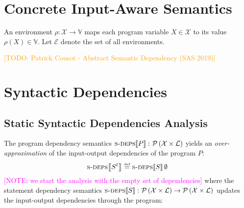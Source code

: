 \documentclass{article}
\newcommand{\defined}{\ensuremath{\stackrel{\mbox{\tiny def}}{=}}\xspace} %
\newcommand{\vars}{\ensuremath{\mathcal{X}}\xspace} %
\newcommand{\vals}{\ensuremath{\mathbb{V}}\xspace} %
\newcommand{\powerset}[1]{\ensuremath{\mathcal{P}\left(#1\right)}\xspace} %
\newcommand{\labels}{\ensuremath{\mathcal{L}}\xspace} %
\newcommand{\envs}{\ensuremath{\mathcal{E}}\xspace} %
\newcommand{\semantics}[1]{\ensuremath{\left\llbracket #1 \right\rrbracket}\xspace} %
\newcommand{\sdeps}[1]{\ensuremath{\textsc{s-deps}\!\semantics{#1}}\xspace} %
\newcommand{\irem}[3]{{\noindent\textcolor{#1}{\textsf{[#2: 
#3]}}}}
\newcommand{\todo}[1]{\irem{orange}{TODO}{#1}}
\newcommand{\note}[1]{\irem{magenta}{NOTE}{#1}}
\begin{document}
\section*{Concrete Input-Aware Semantics}

An environment $\rho\colon \vars \rightarrow \vals$ maps each program variable $X \in \vars$ to its value $\rho(X) \in \vals$. Let \envs denote the set of all environments. 

\todo{Patrick Cousot - Abstract Semantic Dependency (SAS 2019)}


\section*{Syntactic Dependencies}

\subsection*{Static Syntactic Dependencies Analysis}

The program dependency semantics $\sdeps{P} \colon \powerset{\vars \times \labels}$ yields an \emph{over-approximation} of the input-output dependencies of the program $P$:
\begin{equation*}
\sdeps{S^\ell{}} \defined \sdeps{S}\emptyset
\end{equation*}
\note{we start the analysis with the empty set of dependencies}
where the statement dependency semantics $\sdeps{S} \colon \powerset{\vars \times \labels} \rightarrow  \powerset{\vars \times \labels}$ updates the input-output dependencies through the program:
\end{document}
